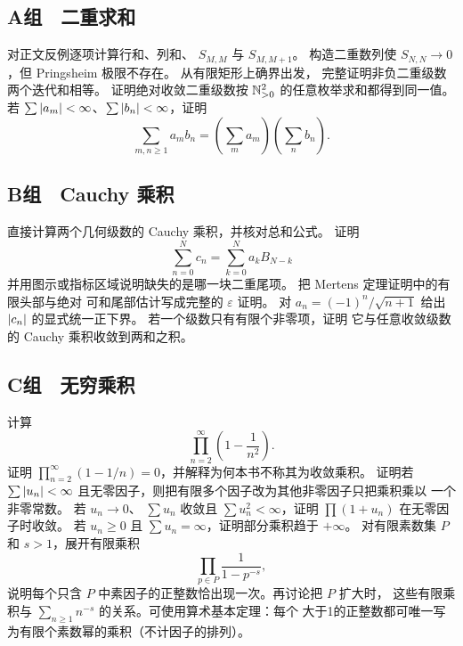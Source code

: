 \subsection*{A组　二重求和}
\begin{enumerate}[label=\textbf{\thechapter.\arabic*.}]
  对正文反例逐项计算行和、列和、
 \(S_{M,M}\) 与 \(S_{M,M+1}\)。
  构造二重数列使
 \(S_{N,N}\to0\)，但 Pringsheim 极限不存在。
  从有限矩形上确界出发，
 完整证明非负二重级数两个迭代和相等。
  证明绝对收敛二重级数按
 \(\mathbb{N}_{>0}^2\) 的任意枚举求和都得到同一值。
  若
 \(\sum\left|a_m\right|<\infty\)、\(\sum\left|b_n\right|<\infty\)，证明
 \[
  \sum_{m,n\ge1}a_mb_n
  =\left(\sum_ma_m\right)\left(\sum_nb_n\right).
 \]
\end{enumerate}

\subsection*{B组　Cauchy 乘积}
\begin{enumerate}[label=\textbf{\thechapter.\arabic*.},resume]
  直接计算两个几何级数的 Cauchy
 乘积，并核对总和公式。
  证明
 \[
  \sum_{n=0}^Nc_n=\sum_{k=0}^Na_kB_{N-k}
 \]
 并用图示或指标区域说明缺失的是哪一块二重尾项。
  把 Mertens 定理证明中的有限头部与绝对
 可和尾部估计写成完整的 \(\varepsilon\) 证明。
  对
 \(a_n=(-1)^n/\sqrt{n+1}\) 给出 \(\left|c_n\right|\) 的显式统一正下界。
  若一个级数只有有限个非零项，证明
 它与任意收敛级数的 Cauchy 乘积收敛到两和之积。
\end{enumerate}

\subsection*{C组　无穷乘积}
\begin{enumerate}[label=\textbf{\thechapter.\arabic*.},resume]
  计算
 \[
  \prod_{n=2}^\infty\left(1-\frac1{n^2}\right).
 \]
  证明
 \(\prod_{n=2}^\infty(1-1/n)=0\)，并解释为何本书不称其为收敛乘积。
  证明若
 \(\sum\left|u_n\right|<\infty\) 且无零因子，则把有限多个因子改为其他非零因子只把乘积乘以
 一个非零常数。
  若 \(u_n\to0\)、
 \(\sum u_n\) 收敛且 \(\sum u_n^2<\infty\)，证明
 \(\prod(1+u_n)\) 在无零因子时收敛。
  若 \(u_n\ge0\) 且
 \(\sum u_n=\infty\)，证明部分乘积趋于 \(+\infty\)。
 对有限素数集 \(P\) 和 \(s>1\)，展开有限乘积
 \[
  \prod_{p\in P}\frac1{1-p^{-s}},
 \]
 说明每个只含 \(P\) 中素因子的正整数恰出现一次。再讨论把 \(P\) 扩大时，
 这些有限乘积与 \(\sum_{n\ge1}n^{-s}\) 的关系。可使用算术基本定理：每个
 大于1的正整数都可唯一写为有限个素数幂的乘积（不计因子的排列）。
\end{enumerate}
